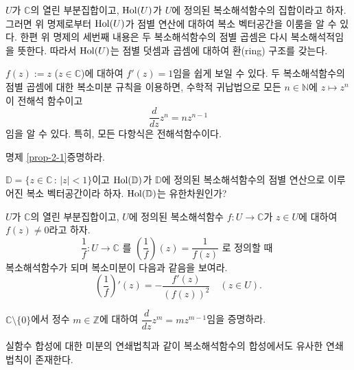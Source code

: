 \begin{salt_remark}\label{remark-2-1}
$U$가 $\mathbb C$의 열린 부분집합이고,
$\mathop{\mathrm{Hol}}(U)$가 $U$에 정의된 복소해석함수의 집합이라고 하자.
그러면 위 명제로부터 $\mathop{\mathrm{Hol}}(U)$가 점별 연산에 대하여 복소 벡터공간을 이룸을 알 수 있다.
한편 위 명제의 세번째 내용은 두 복소해석함수의 점별 곱셈은 다시 복소해석적임을 뜻한다.
따라서 $\mathop{\mathrm{Hol}}(U)$는 점별 덧셈과 곱셈에 대하여
환(ring) 구조를 갖는다.
\end{salt_remark}

\begin{saltexample}[label=example-2-3]{}{}
$f(z):=z$ ($z\in \mathbb C$)에 대하여 $f'(z)=1$임을 쉽게 보일 수 있다.
두 복소해석함수의 점별 곱셈에 대한 복소미분 규칙을 이용하면,
수학적 귀납법으로 모든 $n\in \mathbb N$에 $z\mapsto z^n$이 전해석 함수이고
\[
\dfrac{d}{dz} z^n = nz^{n-1}
\]
임을 알 수 있다.
특히, 모든 다항식은 전해석함수이다.
\end{saltexample}

\begin{salt_exercise} \label{ex-2-4}
명제 \ref{prop-2-1}\을 증명하라.
\end{salt_exercise}


\begin{salt_exercise} \label{ex-2-5}
$\mathbb D = \{ z\in\mathbb C \,:\, |z|<1 \}$이고
$\mathop{\mathrm{Hol}}(\mathbb D)$가 $\mathbb D$에 정의된 복소해석함수의 점별 연산으로 이루어진
복소 벡터공간이라 하자.  $\mathop{\mathrm{Hol}}(\mathbb D)$는 유한차원인가?
\end{salt_exercise}


\begin{salt_exercise} \label{ex-2-6}
$U$가 $\mathbb C$의 열린 부분집합이고,
$U$에 정의된 복소해석함수 $f:U\to \mathbb C$가 
$z\in U$에 대하여 $f(z)\ne 0$라고 하자.
\[
\dfrac 1f : U \to \mathbb C \text{ 를 }
\left( \dfrac 1f \right) (z) = \dfrac 1{f(z)} \text{ 로 정의할 때 }
\]
복소해석함수가 되며 복소미분이 다음과 같음을 보여라.
\[
\left( \dfrac 1f \right)' (z) = - \dfrac{f'(z)}{(f(z))^2} \quad (z\in U).
\]
\end{salt_exercise}

\begin{salt_exercise} \label{ex-2-7}
$\mathbb C\setminus \{0\}$에서 정수 $m\in\mathbb Z$에 대하여
$\dfrac d{dz} z^m = mz^{m-1}$임을 증명하라.
\end{salt_exercise}

실함수 합성에 대한 미분의 연쇄법칙과 같이
복소해석함수의 합성에서도 유사한 연쇄법칙이 존재한다.

\newpage


